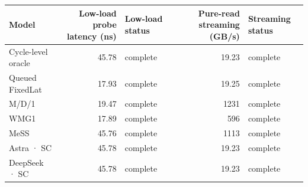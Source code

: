 \begin{tabular}{lrlrl}
\toprule
Model & Low-load probe latency (ns) & Low-load status & Pure-read streaming (GB/s) & Streaming status \\
\midrule
Cycle-level oracle & 45.78 & complete & 19.23 & complete \\
Queued FixedLat & 17.93 & complete & 19.25 & complete \\
M/D/1 & 19.47 & complete & 1231 & complete \\
WMG1 & 17.89 & complete & 596 & complete \\
MeSS & 45.76 & complete & 1113 & complete \\
Astra · SC & 45.78 & complete & 19.23 & complete \\
DeepSeek · SC & 45.78 & complete & 19.23 & complete \\
\bottomrule
\end{tabular}
